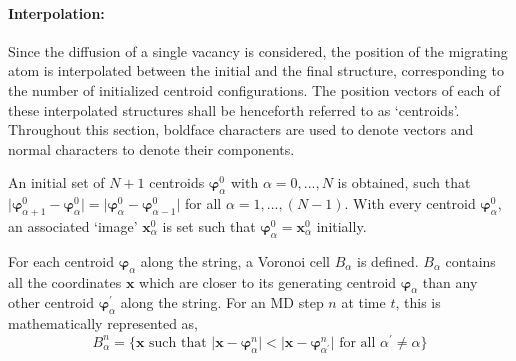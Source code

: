 \documentclass{article}
\begin{document}
\paragraph*{Interpolation:}

Since the diffusion of a single vacancy is considered, the position of the migrating atom is interpolated between the initial and the final structure, corresponding to the number of initialized centroid configurations. The position vectors of each of these interpolated structures shall be henceforth referred to as \enquote*{centroids}. Throughout this section, boldface characters are used to denote vectors and normal characters to denote their components.

An initial set of $N + 1$ centroids $\bm{\varphi}_{\alpha}^0$ with $\alpha=0,...,N$ is obtained, such that $\mathopen|\bm{\varphi}_{\alpha + 1}^0 - \bm{\varphi}_{\alpha}^0\mathclose| = \mathopen|\bm{\varphi}_{\alpha}^0 - \bm{\varphi}_{\alpha - 1}^0\mathclose|$ for all $\alpha=1,...,(N -1)$. With every centroid $\bm{\varphi}_{\alpha}^0$, an associated \enquote*{image} $\bm{x}_{\alpha}^0$ is set such that $\bm{\varphi}_{\alpha}^0 = \bm{x}_{\alpha}^0$ initially.

For each centroid $\bm{\varphi}_{\alpha}$ along the string, a Voronoi cell $B_{\alpha}$ is defined. $B_{\alpha}$ contains all the coordinates $\bm{x}$ which are closer to its generating centroid $\bm{\varphi}_{\alpha}$ than any other centroid $\bm{\varphi}_{\alpha}^{\prime}$ along the string. For an MD step $n$ at time $t$, this is mathematically represented as,
%
\begin{equation} \label{eq:12}
B_{\alpha}^n = \{\bm{x} \text{ such that } \mathopen|\bm{x} - \bm{\varphi}_{\alpha}^n\mathclose| < \mathopen|\bm{x} - \bm{\varphi}_{\alpha^\prime}^n\mathclose| \text{ for all } \alpha^{\prime} \ne \alpha \}
\end{equation}
%
\end{document}
